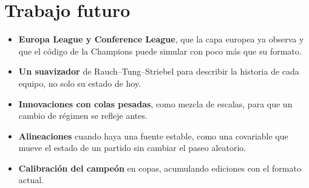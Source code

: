 \section{Trabajo futuro}

\begin{itemize}
\item \textbf{Europa League y Conference League}, que la capa europea ya observa y que el código de la Champions puede simular con poco más que su formato.
\item \textbf{Un suavizador} de Rauch–Tung–Striebel para describir la historia de cada equipo, no solo su estado de hoy.
\item \textbf{Innovaciones con colas pesadas}, como mezcla de escalas, para que un cambio de régimen se refleje antes.
\item \textbf{Alineaciones} cuando haya una fuente estable, como una covariable que mueve el estado de un partido sin cambiar el paseo aleatorio.
\item \textbf{Calibración del campeón} en copas, acumulando ediciones con el formato actual.
\end{itemize}
